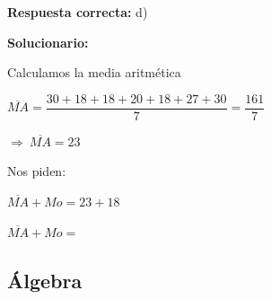 \begin{enumerate}
	\textbf{Respuesta correcta:} d)

	\vspace{2mm}
	\textbf{Solucionario:}

	Calculamos la media aritmética

	$\overline{MA}=\dfrac{30+18+18+20+18+27+30}{7}=\dfrac{161}{7}$

	$\Rightarrow\ \overline{MA}=23$

	Nos piden:

	$\overline{MA}+Mo=23+18$

	$\overline{MA}+Mo=$



\end{enumerate}











\subsection*{Álgebra}

